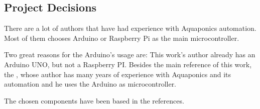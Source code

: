 \subsection{Project Decisions}
There are a lot of authors that have had experience with Aquaponics automation.
Most of them chooses Arduino or Raspberry Pi as the main microcontroller.

Two great reasons for the Arduino's usage are:
This work's author already has an Arduino UNO,
but not a Raspberry PI.
Besides the main reference of this work,
the \cite{Kretzinger2015},
whose author has many years of experience with Aquaponics and its automation and he uses the Arduino as microcontroller.

The chosen components have been based in the references.
